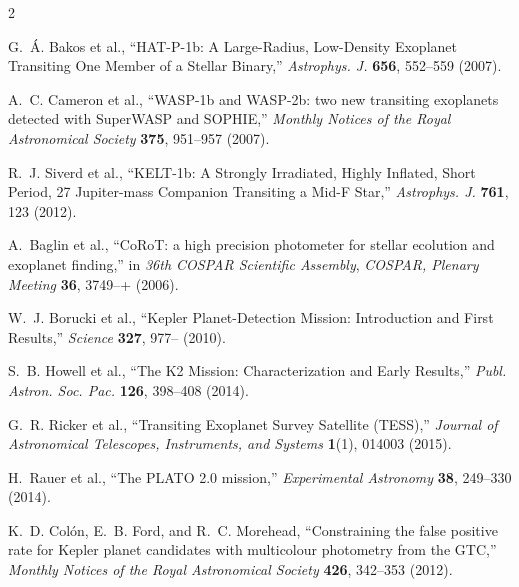 \documentclass[a4paper,12pt]{spieman}  %
\begin{document}
\begin{spacing}{2}
\clearpage


\begin{thebibliography}{}

G.~{\'A}. {Bakos} et al., ``{HAT-P-1b: A Large-Radius, Low-Density Exoplanet Transiting One
  Member of a Stellar Binary},'' {\em Astrophys. J.} {\bf 656}, 552--559  (2007).

A.~C. {Cameron} et al., ``{WASP-1b
  and WASP-2b: two new transiting exoplanets detected with SuperWASP and
  SOPHIE},'' {\em Monthly Notices of the Royal Astronomical Society} {\bf 375}, 951--957  (2007).

R.~J. {Siverd} et al., ``{KELT-1b: A Strongly Irradiated, Highly Inflated, Short Period, 27
  Jupiter-mass Companion Transiting a Mid-F Star},'' {\em Astrophys. J.} {\bf 761}, 123
  (2012).

A.~{Baglin} et al., ``{CoRoT: a high
  precision photometer for stellar ecolution and exoplanet finding},'' in {\em
  36th COSPAR Scientific Assembly},  {\em COSPAR, Plenary Meeting} {\bf 36},
  3749--+  (2006).

W.~J. {Borucki} et al., ``{Kepler Planet-Detection Mission: Introduction
  and First Results},'' {\em Science} {\bf 327}, 977--  (2010).

S.~B. {Howell} et al., ``{The K2
  Mission: Characterization and Early Results},'' {\em Publ. Astron. Soc. Pac.} {\bf 126},
  398--408  (2014).

G.~R. {Ricker} et al., ``{Transiting Exoplanet Survey Satellite (TESS)},'' {\em
  Journal of Astronomical Telescopes, Instruments, and Systems} {\bf 1}(1),
  014003  (2015).

H.~{Rauer} et al., ``{The PLATO 2.0 mission},'' {\em Experimental Astronomy}
  {\bf 38}, 249--330  (2014).

K.~D. {Col{\'o}n}, E.~B. {Ford}, and R.~C. {Morehead}, ``{Constraining the
  false positive rate for Kepler planet candidates with multicolour photometry
  from the GTC},'' {\em Monthly Notices of the Royal Astronomical Society} {\bf 426}, 342--353  (2012).


\end{thebibliography}
\end{spacing}
\end{document}

